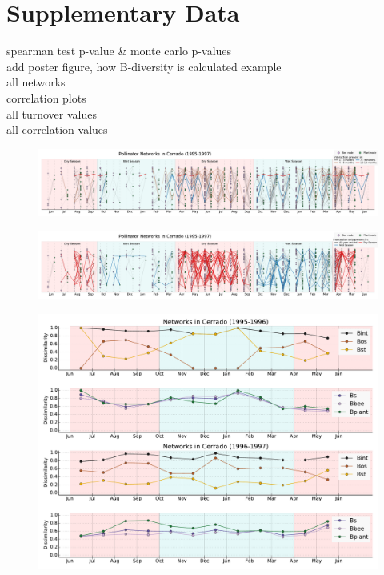 \documentclass[11pt]{article}
\begin{document}
\section*{Supplementary Data}
spearman test p-value \& monte carlo p-values \\
add poster figure, how B-diversity is calculated example  \\
all networks \\
correlation plots \\
all turnover values \\
all correlation values \\

\newpage
\begin{landscape}

\begin{figure}[H]
  \centering
    \includegraphics[width=260mm]{network(old).pdf}
\end{figure}

\begin{figure}[H]
  \centering
    \includegraphics[width=260mm]{seasonalnetwork(old).pdf}
\end{figure}

\begin{figure}[H]
  \centering
    \includegraphics[width=250mm]{TurnoversAcrossTime(old).pdf}
\end{figure}


\end{landscape}
\end{document}
